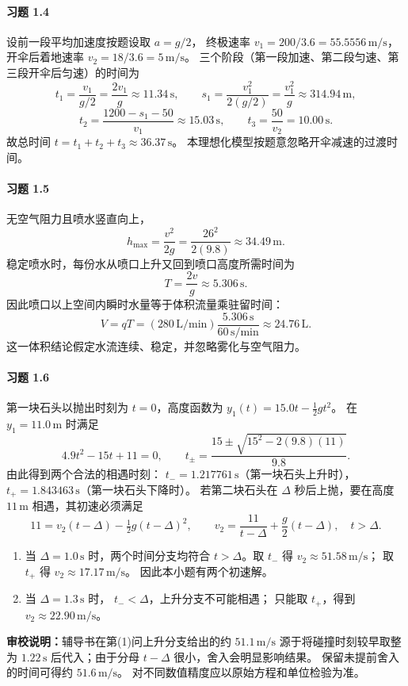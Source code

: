 \paragraph{习题 1.4}
设前一段平均加速度按题设取 \(a=g/2\)，
终极速率 \(v_1=200/3.6=55.5556\,\mathrm{m/s}\)，
开伞后着地速率 \(v_2=18/3.6=5\,\mathrm{m/s}\)。
三个阶段（第一段加速、第二段匀速、第三段开伞后匀速）的时间为
\[
 t_1=\frac{v_1}{g/2}=\frac{2v_1}{g}\approx11.34\,\mathrm{s},
 \qquad
 s_1=\frac{v_1^2}{2(g/2)}=\frac{v_1^2}{g}\approx314.94\,\mathrm{m},
\]
\[
 t_2=\frac{1200-s_1-50}{v_1}\approx15.03\,\mathrm{s},
 \qquad t_3=\frac{50}{v_2}=10.00\,\mathrm{s}.
\]
故总时间 \(t=t_1+t_2+t_3\approx36.37\,\mathrm{s}\)。
本理想化模型按题意忽略开伞减速的过渡时间。

\paragraph{习题 1.5}
无空气阻力且喷水竖直向上，
\[
 h_{\max}=\frac{v^2}{2g}
 =\frac{26^2}{2(9.8)}\approx34.49\,\mathrm{m}.
\]
稳定喷水时，每份水从喷口上升又回到喷口高度所需时间为
\[
 T=\frac{2v}{g}\approx5.306\,\mathrm{s}.
\]
因此喷口以上空间内瞬时水量等于体积流量乘驻留时间：
\[
 V=qT=(280\,\mathrm{L/min})
 \frac{5.306\,\mathrm{s}}{60\,\mathrm{s/min}}
 \approx24.76\,\mathrm{L}.
\]
这一体积结论假定水流连续、稳定，并忽略雾化与空气阻力。

\paragraph{习题 1.6}
第一块石头以抛出时刻为 \(t=0\)，高度函数为
\(y_1(t)=15.0t-\frac12gt^2\)。
在 \(y_1=11.0\,\mathrm{m}\) 时满足
\[
 4.9t^2-15t+11=0,\qquad
 t_\pm=\frac{15\pm\sqrt{15^2-2(9.8)(11)}}{9.8}.
\]
由此得到两个合法的相遇时刻：
\(t_-=1.217761\,\mathrm{s}\)（第一块石头上升时），
\(t_+=1.843463\,\mathrm{s}\)（第一块石头下降时）。
若第二块石头在 \(\Delta\) 秒后上抛，要在高度
\(11\,\mathrm{m}\) 相遇，其初速必须满足
\[
 11=v_2(t-\Delta)-\tfrac12g(t-\Delta)^2,
 \qquad
 v_2=\frac{11}{t-\Delta}+\frac{g}{2}(t-\Delta),
 \quad t>\Delta.
\]
\begin{enumerate}
\item 当 \(\Delta=1.0\,\mathrm{s}\) 时，两个时间分支均符合
 \(t>\Delta\)。取 \(t_-\) 得 \(v_2\approx51.58\,\mathrm{m/s}\)；
 取 \(t_+\) 得 \(v_2\approx17.17\,\mathrm{m/s}\)。
 因此本小题有两个初速解。
\item 当 \(\Delta=1.3\,\mathrm{s}\) 时，
 \(t_-<\Delta\)，上升分支不可能相遇；
 只能取 \(t_+\)，得到 \(v_2\approx22.90\,\mathrm{m/s}\)。
\end{enumerate}
\textbf{审校说明：}辅导书在第(1)问上升分支给出的约
\(51.1\,\mathrm{m/s}\) 源于将碰撞时刻较早取整为
\(1.22\,\mathrm{s}\) 后代入；由于分母
\(t-\Delta\) 很小，舍入会明显影响结果。
保留未提前舍入的时间可得约 \(51.6\,\mathrm{m/s}\)。
对不同数值精度应以原始方程和单位检验为准。

